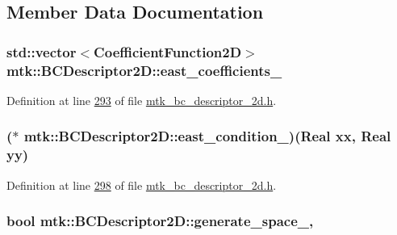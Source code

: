 \subsection{Member Data Documentation}
\hypertarget{classmtk_1_1BCDescriptor2D_a1f90fc303984bf18c136a34896bbb7c9}{
\subsubsection[{east\+\_\+coefficients\+\_\+}]{\setlength{\rightskip}{0pt plus 5cm}std\+::vector$<${\bf Coefficient\+Function2\+D}$>$ mtk\+::\+B\+C\+Descriptor2\+D\+::east\+\_\+coefficients\+\_\+\hspace{0.3cm}{\ttfamily [private]}}}\label{classmtk_1_1BCDescriptor2D_a1f90fc303984bf18c136a34896bbb7c9}


Definition at line \hyperlink{mtk__bc__descriptor__2d_8h_source_l00293}{293} of file \hyperlink{mtk__bc__descriptor__2d_8h_source}{mtk\+\_\+bc\+\_\+descriptor\+\_\+2d.\+h}.

\hypertarget{classmtk_1_1BCDescriptor2D_a6cca0c70293203c9d88773e5d5f93418}{
\subsubsection[{east\+\_\+condition\+\_\+}]{($\ast$ mtk\+::\+B\+C\+Descriptor2\+D\+::east\+\_\+condition\+\_\+)({\bf Real} xx, {\bf Real} yy)\hspace{0.3cm}{\ttfamily [private]}}}\label{classmtk_1_1BCDescriptor2D_a6cca0c70293203c9d88773e5d5f93418}


Definition at line \hyperlink{mtk__bc__descriptor__2d_8h_source_l00298}{298} of file \hyperlink{mtk__bc__descriptor__2d_8h_source}{mtk\+\_\+bc\+\_\+descriptor\+\_\+2d.\+h}.

\hypertarget{classmtk_1_1BCDescriptor2D_a3ef0bc7e9fbc16669099314dd34b170a}{
\subsubsection[{generate\+\_\+space\+\_\+}]{\setlength{\rightskip}{0pt plus 5cm}bool mtk\+::\+B\+C\+Descriptor2\+D\+::generate\+\_\+space\+\_\+\hspace{0.3cm}{\ttfamily [mutable]}, {\ttfamily [private]}}}\label{classmtk_1_1BCDescriptor2D_a3ef0bc7e9fbc16669099314dd34b170a}


